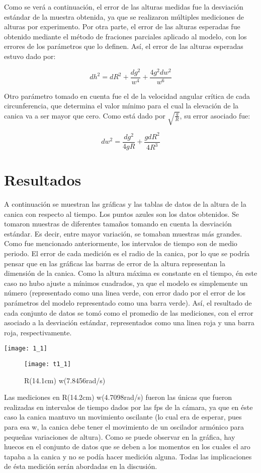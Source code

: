 \documentclass[12p]{article}
\begin{document}
Como se verá a continuación, el error de las alturas medidas fue la desviación estándar de la muestra obtenida, ya que se realizaron múltiples mediciones de alturas por experimento. Por otra parte, el error de las alturas esperadas fue obtenido mediante el método de fraciones parciales aplicado al modelo, con los errores de los parámetros que lo definen. Así, el error de las alturas esperadas estuvo dado por:

$$dh^2=dR^2+\frac{dg^2}{w^4}+\frac{4g^2dw^2}{w^6}$$

Otro parámetro tomado en cuenta fue el de la velocidad angular crítica de cada circunferencia, que determina el valor mínimo para el cual la elevación de la canica va a ser mayor que cero. Como está dado por $\sqrt{\frac{g}{R}}$, su error asociado fue:

$$dw^2=\frac{dg^2}{4gR}+\frac{gdR^2}{4R^3}$$

\section{Resultados}
A continuación se muestran las gráficas y las tablas de datos de la altura de la canica con respecto al tiempo. Los puntos azules son los datos obtenidos. Se tomaron muestras de diferentes tamaños tomando en cuenta la desviación estándar. Es decir, entre mayor variación, se tomaban muestras más grandes. Como fue mencionado anteriormente, los intervalos de tiempo son de medio periodo.
 El error de cada medición es el radio de la canica, por lo que se podría pensar que en las gráficas las barras de error de la altura representan la dimensión de la canica.
Como la altura máxima es constante en el tiempo, én este caso no hubo ajuste a mínimos cuadrados, ya que el modelo es simplemente un número (representado como una linea verde, con error dado por el error de los parámetros del modelo representado como una barra verde). Así, el resultado de cada conjunto de datos se tomó como el promedio de las mediciones, con el error asociado a la desviación estándar, representados como una linea roja y una barra roja, respectivamente.

\texttt{[image: 1\_1]}
\begin{figure}
   \texttt{[image: t1\_1]}
  \caption{R(14.1cm) w(7.8456rad/s)}
\end{figure}

Las mediciones en R(14.2cm) w(4.7098rad/s) fueron las únicas que fueron realizadas en intervalos de tiempo dados por las fps de la cámara, ya que en éste caso la canica mantuvo un movimiento oscilante (lo cual era de esperar, pues para esa w, la canica debe tener el movimiento de un oscilador armónico para pequeñas variaciones de altura). Como se puede observar en la gráfica, hay huecos en el conjunto de datos que se deben a los momentos en los cuales el aro tapaba a la canica y no se podía hacer medición alguna. Todas las implicaciones de ésta medición serán abordadas en la discusión.
\end{document}
